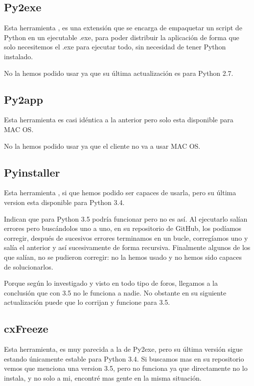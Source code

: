 \subsection{Py2exe}
Esta herramienta \cite{p2exe}, es una extensión que se encarga de empaquetar un script de Python en un ejecutable .exe, para poder distribuir la aplicación de forma que solo necesitemos el .exe para ejecutar todo, sin necesidad de tener Python instalado.

No la hemos podido usar ya que su última actualización es para Python 2.7.

\subsection{Py2app}
Esta herramienta es casi idéntica a la anterior pero solo esta disponible para MAC OS.

No la hemos podido usar ya que el cliente no va a usar MAC OS.

\subsection{Pyinstaller}
Esta herramienta \cite{Pyinstaller}, si que hemos podido ser capaces de usarla, pero su última version esta disponible para Python 3.4.

Indican que para Python 3.5 podría funcionar pero no es así. Al ejecutarlo salían errores pero buscándolos uno a uno, en su repositorio de GitHub, los podíamos corregir, después de sucesivos errores terminamos en un bucle, corregíamos uno y salía el anterior y así sucesivamente de forma recursiva. 
Finalmente algunos de los que salían, no se pudieron corregir: 
no la hemos usado y no hemos sido capaces de solucionarlos.

Porque según lo investigado y visto en todo tipo de foros, llegamos a la conclusión que con 3.5 no le funciona a nadie.
No obstante en su siguiente actualización puede que lo corrijan y funcione para 3.5.

\subsection{cxFreeze}
Esta herramienta, es muy parecida a la de Py2exe, pero su última versión sigue estando únicamente estable para Python 3.4. 
Si buscamos mas en su repositorio vemos que menciona una version 3.5, pero no funciona ya que directamente no lo instala, y no solo a mi, encontré mas gente en la misma situación.

